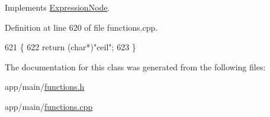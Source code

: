 Implements \hyperlink{classExpressionNode_a42a5e9562b0f645a19dcc83f698069b5}{Expression\+Node}.



Definition at line 620 of file functions.\+cpp.


\begin{DoxyCode}
621 \{
622     \textcolor{keywordflow}{return} (\textcolor{keywordtype}{char}*)\textcolor{stringliteral}{"ceil"};
623 \}
\end{DoxyCode}


The documentation for this class was generated from the following files\+:\begin{DoxyCompactItemize}
\item 
app/main/\hyperlink{functions_8h}{functions.\+h}\item 
app/main/\hyperlink{functions_8cpp}{functions.\+cpp}\end{DoxyCompactItemize}
